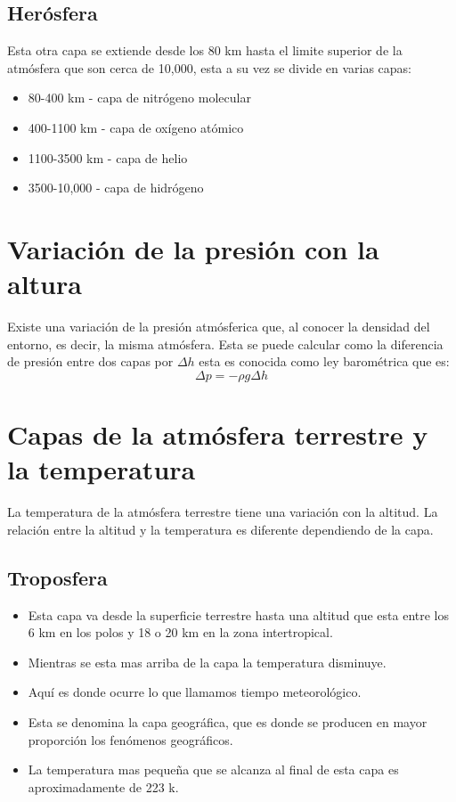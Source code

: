 \documentclass{article} %
\begin{document}
\subsection{Herósfera}
Esta otra capa se extiende desde los 80 km hasta el limite superior de la atmósfera que son cerca de 10,000, esta a su vez se divide en varias capas:
 \begin{itemize}
         \item 80-400 km -  capa de nitrógeno molecular
         \item 400-1100 km -  capa de oxígeno atómico
         \item 1100-3500 km - capa de helio
         \item 3500-10,000 - capa de hidrógeno
\end{itemize}
\section{Variación de la presión con la altura} 
Existe una variación de la presión atmósferica que, al conocer la densidad del entorno, es decir, la misma atmósfera. Esta se puede calcular como la diferencia de presión entre dos capas por $\Delta h$ esta es conocida como ley barométrica que es:
\begin{equation}
    \Delta p=-\rho g\Delta h
\end{equation}
\section{Capas de la atmósfera terrestre y la temperatura}
La temperatura de la atmósfera terrestre tiene una variación con la altitud. La relación entre la altitud y la temperatura es diferente dependiendo de la capa.
\subsection{Troposfera}
    \begin{itemize}
    \item Esta capa va desde la superficie terrestre hasta una altitud que esta entre los 6 km en los polos y 18 o 20 km en la zona intertropical. \item Mientras se esta mas arriba de la capa la temperatura disminuye.
    \item Aquí es donde ocurre lo que llamamos tiempo meteorológico.
    \item Esta se denomina la capa geográfica, que es donde se producen en mayor proporción los fenómenos geográficos.
    \item La temperatura mas pequeña que se alcanza al final de esta capa es aproximadamente de 223 k. \end{itemize}
\end{document}
